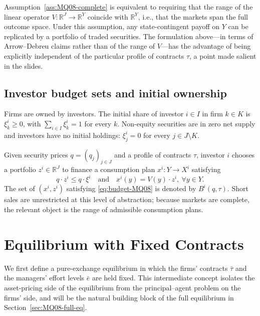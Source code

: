 \documentclass[11pt,a4paper,oneside]{book}
\def\R{\mathbb{R}}
\def\leq{\leqslant}
\def\geq{\geqslant}
\def\et{\quad \text{and} \quad}
\theoremstyle{plain}
\theoremstyle{definition}
\theoremstyle{remark}
\numberwithin{equation}{chapter}
\begin{document}
Assumption~\ref{ass:MQ08-complete} is equivalent to requiring that the range of the linear operator $V : \R^J \to \R^Y$ coincide with $\R^Y$, i.e., that the markets span the full outcome space.
Under this assumption, any state-contingent payoff on $Y$ can be replicated by a portfolio of traded securities.
The formulation above---in terms of Arrow--Debreu claims rather than of the range of $V$---has the advantage of being explicitly independent of the particular profile of contracts $\tau$, a point made salient in the slides.

\subsection{Investor budget sets and initial ownership}

Firms are owned by investors.
The initial share of investor $i \in I$ in firm $k \in K$ is $\xi^i_k \geq 0$, with $\sum_{i \in I} \xi^i_k = 1$ for every $k$.
Non-equity securities are in zero net supply and investors have no initial holdings: $\xi^i_j = 0$ for every $j \in J \setminus K$.

Given security prices $q = (q_j)_{j \in J}$ and a profile of contracts $\tau$, investor $i$ chooses a portfolio $z^i \in \R^J$ to finance a consumption plan $x^i : Y \to X^i$ satisfying
\begin{equation}\label{eq:budget-MQ08}
  q \cdot z^i \leq q \cdot \xi^i
  \et
  x^i(y) = V(y) \cdot z^i, \ \forall y \in Y.
\end{equation}
The set of $(x^i, z^i)$ satisfying \eqref{eq:budget-MQ08} is denoted by $B^i(q, \tau)$.
Short sales are unrestricted at this level of abstraction; because markets are complete, the relevant object is the range of admissible consumption plans.

\section{Equilibrium with Fixed Contracts}
\label{sec:MQ08-eq-fixed}

We first define a pure-exchange equilibrium in which the firms' contracts $\bar{\tau}$ and the managers' effort levels $\bar{e}$ are held fixed.
This intermediate concept isolates the asset-pricing side of the equilibrium from the principal--agent problem on the firms' side, and will be the natural building block of the full equilibrium in Section~\ref{sec:MQ08-full-eq}.
\end{document}
